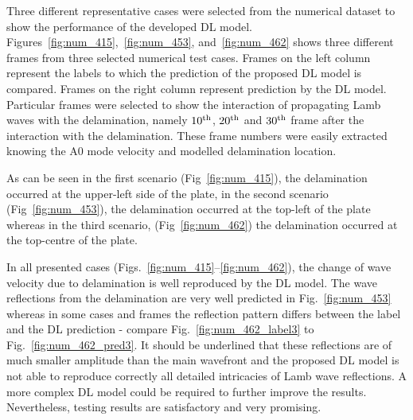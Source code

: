 \documentclass[pdflatex,sn-mathphys-num]{sn-jnl}%
\begin{document}
	Three different representative cases were selected from the numerical 
	dataset to show the performance of the developed DL model.
	Figures~\ref{fig:num_415},~\ref{fig:num_453}, 
	and~\ref{fig:num_462} shows three different frames from three selected 
	numerical test cases.  
	Frames on the left column represent the labels to which the prediction of 
	the proposed DL model is compared.
	Frames on the right column represent prediction by the DL model.
	Particular frames were selected to show the interaction of propagating Lamb 
	waves with the delamination, namely $10\textsuperscript{th}$, 
	$20\textsuperscript{th}$ and $30\textsuperscript{th}$ frame after the 
	interaction with the delamination. These frame numbers were easily 
	extracted knowing the A0 mode velocity and modelled delamination location. 
	
	As can be seen in the first scenario (Fig~\ref{fig:num_415}), the 
	delamination occurred at the upper-left side of the plate, in the second 
	scenario (Fig~\ref{fig:num_453}), the delamination occurred at the top-left 
	of the plate whereas in the third scenario, (Fig~\ref{fig:num_462}) the 
	delamination occurred at the top-centre of the plate. 
	
	In all presented cases (Figs.~\ref{fig:num_415}--\ref{fig:num_462}), the 
	change of wave velocity due to delamination is well reproduced by the DL 
	model.
	The wave reflections from the delamination are very well predicted in 
	Fig.~\ref{fig:num_453} whereas in some cases and frames the reflection 
	pattern differs between the label and the DL prediction - compare 
	Fig.~\ref{fig:num_462_label3} to Fig.~\ref{fig:num_462_pred3}.
	It should be underlined that these reflections are of much smaller 
	amplitude than the main wavefront and the proposed DL model is not able to 
	reproduce correctly all detailed intricacies of Lamb wave reflections. 
	A more complex DL model could be required to further improve the results.
	Nevertheless, testing results are satisfactory and very promising.
	
\end{document}
